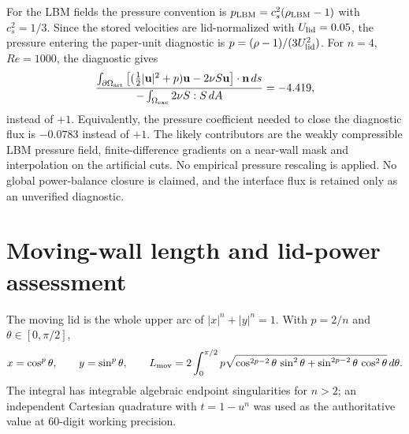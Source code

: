 \documentclass[11pt]{article}
\newcommand{\tabbox}[1]{\resizebox{\ifdim\width>\textwidth\textwidth\else\width\fi}{!}{#1}}
\begin{document}
For the LBM fields the pressure convention is
$p_{\rm LBM}=c_s^2(\rho_{\rm LBM}-1)$ with $c_s^2=1/3$. Since the stored
velocities are lid-normalized with $U_{\rm lid}=0.05$, the pressure entering
the paper-unit diagnostic is
$p=(\rho-1)/(3U_{\rm lid}^2)$. For $n=4$, $Re=1000$, the diagnostic gives
\begin{equation}
  \frac{\int_{\partial\Omega_{\rm art}}
        \left[(\tfrac12|\mathbf{u}|^2+p)\mathbf{u}-2\nu S\mathbf{u}\right]\cdot\mathbf{n}\,ds}
       {-\int_{\Omega_{\rm exc}}2\nu S:S\,dA}
  =-4.419 ,
  \label{eq:flux_ratio}
\end{equation}
instead of $+1$. Equivalently, the pressure coefficient needed to close the
diagnostic flux is $-0.0783$ instead of $+1$. The likely contributors are
the weakly compressible LBM pressure field, finite-difference gradients on a
near-wall mask and interpolation on the artificial cuts. No empirical pressure
rescaling is applied. No global power-balance closure is claimed, and the
interface flux is retained only as an unverified diagnostic.

\section{Moving-wall length and lid-power assessment}
\label{sec:lidpower}

The moving lid is the whole upper arc of $|x|^n+|y|^n=1$. With $p=2/n$ and
$\theta\in[0,\pi/2]$,
\begin{equation}
  x=\cos^p\theta,\qquad y=\sin^p\theta,\qquad
  L_{\rm mov}=2\int_0^{\pi/2}
  p\sqrt{\cos^{2p-2}\theta\,\sin^2\theta+
        \sin^{2p-2}\theta\,\cos^2\theta}\,d\theta .
  \label{eq:lmov}
\end{equation}
The integral has integrable algebraic endpoint singularities for $n>2$;
an independent Cartesian quadrature with $t=1-u^n$ was used as the
authoritative value at $60$-digit working precision.

\begin{table}[H]
\centering
\caption{Upper-half moving-wall arclength for $L_c=2$. The $n=2$ value is
$\pi$; the diamond and square limits are validated separately below.}




\label{tab:lmov}
\tabbox{}
\end{table}
\par
\end{document}
